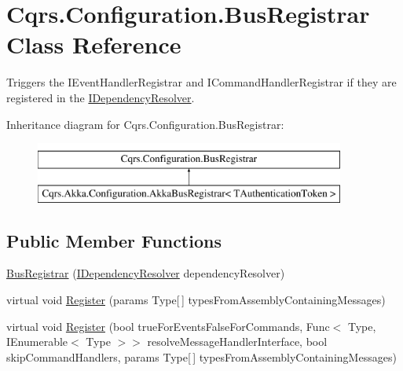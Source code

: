 \hypertarget{classCqrs_1_1Configuration_1_1BusRegistrar}{}\section{Cqrs.\+Configuration.\+Bus\+Registrar Class Reference}
\label{classCqrs_1_1Configuration_1_1BusRegistrar}


Triggers the I\+Event\+Handler\+Registrar and I\+Command\+Handler\+Registrar if they are registered in the \hyperlink{interfaceCqrs_1_1Configuration_1_1IDependencyResolver}{I\+Dependency\+Resolver}.  


Inheritance diagram for Cqrs.\+Configuration.\+Bus\+Registrar\+:\begin{figure}[H]
\begin{center}
\leavevmode
\includegraphics[height=2.000000cm]{classCqrs_1_1Configuration_1_1BusRegistrar}
\end{center}
\end{figure}
\subsection*{Public Member Functions}
\begin{DoxyCompactItemize}
\item 
\hyperlink{classCqrs_1_1Configuration_1_1BusRegistrar_a4a934d21a535b28af6c67154512bba20_a4a934d21a535b28af6c67154512bba20}{Bus\+Registrar} (\hyperlink{interfaceCqrs_1_1Configuration_1_1IDependencyResolver}{I\+Dependency\+Resolver} dependency\+Resolver)
\item 
virtual void \hyperlink{classCqrs_1_1Configuration_1_1BusRegistrar_ab8deb04dc9cb6b80f32b54c847dfb1b3_ab8deb04dc9cb6b80f32b54c847dfb1b3}{Register} (params Type\mbox{[}$\,$\mbox{]} types\+From\+Assembly\+Containing\+Messages)
\item 
virtual void \hyperlink{classCqrs_1_1Configuration_1_1BusRegistrar_abc3af2b8dfeeb49f5e5461456ae01f67_abc3af2b8dfeeb49f5e5461456ae01f67}{Register} (bool true\+For\+Events\+False\+For\+Commands, Func$<$ Type, I\+Enumerable$<$ Type $>$$>$ resolve\+Message\+Handler\+Interface, bool skip\+Command\+Handlers, params Type\mbox{[}$\,$\mbox{]} types\+From\+Assembly\+Containing\+Messages)
\end{DoxyCompactItemize}
